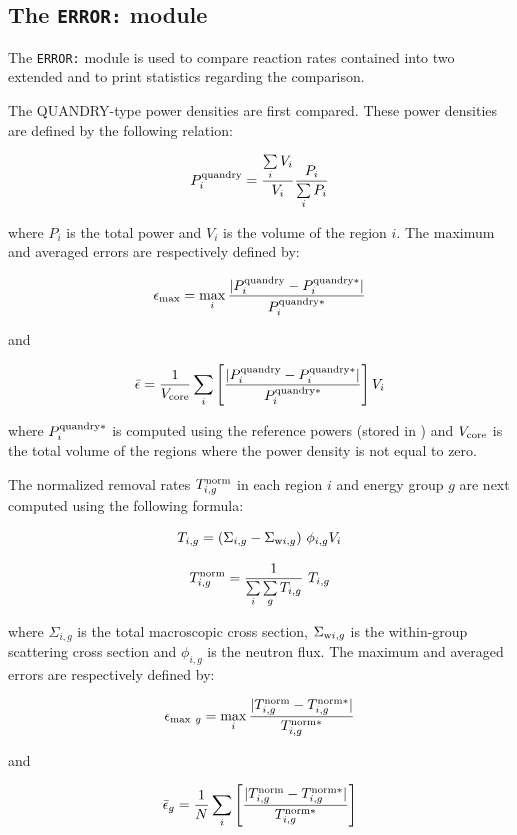 \subsection{The {\tt ERROR:} module}

The {\tt ERROR:} module is used to compare reaction rates contained into two extended  and to print statistics regarding the comparison.

\vskip 0.2cm

The QUANDRY-type power densities are first compared. These power densities are defined by the following relation:

$$P^{\rm quandry}_i={\sum\limits_i V_i \over V_i} {P_i \over \sum\limits_i P_i}$$

\noindent where $P_i$ is the total power and $V_i$ is the volume of the  region $i$. The maximum and averaged errors are respectively defined by:

$$\epsilon_{\rm max}=\max_i {|P_i^{\rm quandry}-P_i^{{\rm quandry}*}| \over P_i^{{\rm quandry}*}}$$

\noindent and

$$\bar\epsilon = {1 \over V_{\rm core}} \sum_i \left[ {|P_i^{\rm quandry}-P_i^{{\rm quandry}*}| \over P_i^{{\rm quandry}*}}\right] V_i$$

\noindent where $P_i^{{\rm quandry}*}$ is computed using the reference powers (stored in ) and $V_{\rm core}$ is the total volume of the regions where the power density is not equal to zero.

\vskip 0.2cm

The normalized removal rates $T_{i,g}^{\rm norm}$ in each region $i$ and energy group $g$ are next computed using the following formula:

$$T_{i,g}=(\Sigma_{i,g} -\Sigma_{{\rm w}i,g}) \ \phi_{i,g} V_i$$

$$T_{i,g}^{\rm norm}={1 \over \sum\limits_i \sum\limits_g T_{i,g}} \ T_{i,g}$$

\noindent where $\Sigma_{i,g}$ is the total macroscopic cross section, $\Sigma_{{\rm w}i,g}$ is the within-group scattering cross section and $\phi_{i,g}$ is the neutron flux. The maximum and averaged errors are respectively defined by:

$$\epsilon_{{\rm max} \ g}=\max_i {|T_{i,g}^{\rm norm}-T_{i,g}^{{\rm norm}*}| \over T_{i,g}^{{\rm norm}*}}$$

\noindent and

$$\bar\epsilon_g = {1 \over N} \sum_i \left[ {|T_{i,g}^{\rm norm}-T_{i,g}^{{\rm norm}*}| \over T_{i,g}^{{\rm norm}*}}\right]$$

